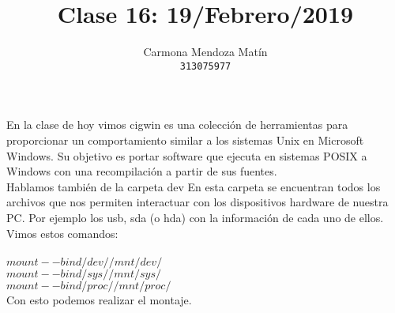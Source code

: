 \documentclass[11pt, a4paper]{report}
\begin{document}
\title{Clase 16: 19/Febrero/2019}
\author{
  Carmona Mendoza Mat\'in\\
  \texttt{313075977}
}
\date{}
\maketitle

En la clase de hoy vimos cigwin es una colección de herramientas
para proporcionar un comportamiento similar a los sistemas
Unix en Microsoft Windows. Su objetivo es portar software que ejecuta en
sistemas POSIX a Windows con una recompilación a partir de sus fuentes. \\

Hablamos también de la carpeta dev En esta carpeta se encuentran todos
los archivos que nos permiten interactuar con los dispositivos hardware
de nuestra PC. Por ejemplo los usb, sda (o hda) con la información de cada
uno de ellos. \\

Vimos estos comandos: \\
\\
$mount --bind /dev/ /mnt/dev/$ \\
$mount --bind /sys/ /mnt/sys/$ \\
$mount --bind /proc/ /mnt/proc/$ \\

Con esto podemos realizar el montaje. 
\end{document}
